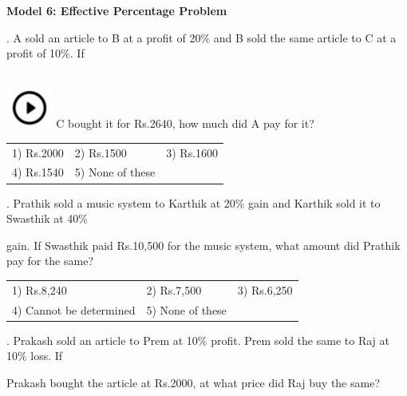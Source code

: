 \documentclass{article}
\begin{document}
	
	
	
	\noindent 
	
	\noindent 
	
	\noindent \textbf{Model 6: Effective Percentage Problem}
	
	\noindent 
	
	. A sold an article to B at a profit of 20\% and B sold the same article to C at a profit of 10\%. If
	
	\noindent \noindent \\ \includegraphics*[width=0.60in, height=0.52in]{images/image1} C bought it for Rs.2640, how much did A pay for it?
	
	\noindent  
	\begin{tabular}{p{1.7in} p{1.6in} p{1.6in}} \\ 
 1) Rs.2000               & 2) Rs.1500        & 3) Rs.1600        \\
4) Rs.1540        & 5) None of these  \\
\end{tabular}
	
	\noindent 
	
	\noindent 
\newpage
	. Prathik sold a music system to Karthik at 20\% gain and Karthik sold it to Swasthik at 40\%
	
	\noindent 
	
	\noindent gain. If Swasthik paid Rs.10,500 for the music system, what amount did Prathik pay for the same? 
	
		 
	\begin{tabular}{p{1.7in} p{1.6in} p{1.6in}} \\ 
 1) Rs.8,240 & 2) Rs.7,500  & 3) Rs.6,250 \\
4) Cannot be determined & 5) None of these  \\
\end{tabular}
	
	
	
	
	\noindent 
	
	\noindent 
	
	. Prakash sold an article to Prem at 10\% profit. Prem sold the same to Raj at 10\% loss. If
	
	\noindent 
	
	\noindent Prakash bought the article at Rs.2000, at what price did Raj buy the same?
	
\end{document}
